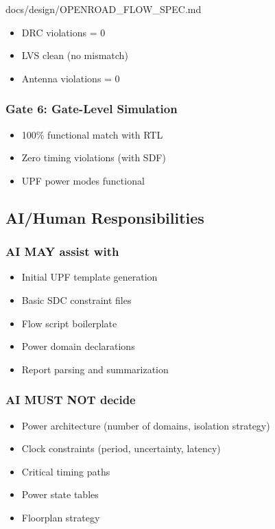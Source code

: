 \begin{relocated}{docs/design/OPENROAD_FLOW_SPEC.md}
\begin{itemize}
\tightlist
\item[$\boxtimes$]
  DRC violations = 0
\item[$\boxtimes$]
  LVS clean (no mismatch)
\item[$\boxtimes$]
  Antenna violations = 0
\end{itemize}

\subsubsection{Gate 6: Gate-Level Simulation}\label{tm:pd:openroad-flow:gate-6-gate-level-simulation}

\begin{itemize}
\tightlist
\item[$\boxtimes$]
  100\% functional match with RTL
\item[$\boxtimes$]
  Zero timing violations (with SDF)
\item[$\boxtimes$]
  UPF power modes functional
\end{itemize}

\subsection{AI/Human Responsibilities}\label{tm:pd:openroad-flow:aihuman-responsibilities}

\subsubsection{AI MAY assist with}\label{tm:pd:openroad-flow:ai-may-assist-with}

\begin{itemize}
\tightlist
\item
  Initial UPF template generation
\item
  Basic SDC constraint files
\item
  Flow script boilerplate
\item
  Power domain declarations
\item
  Report parsing and summarization
\end{itemize}

\subsubsection{AI MUST NOT decide}\label{tm:pd:openroad-flow:ai-must-not-decide}

\begin{itemize}
\tightlist
\item
  Power architecture (number of domains, isolation strategy)
\item
  Clock constraints (period, uncertainty, latency)
\item
  Critical timing paths
\item
  Power state tables
\item
  Floorplan strategy
\end{itemize}


\end{relocated}
